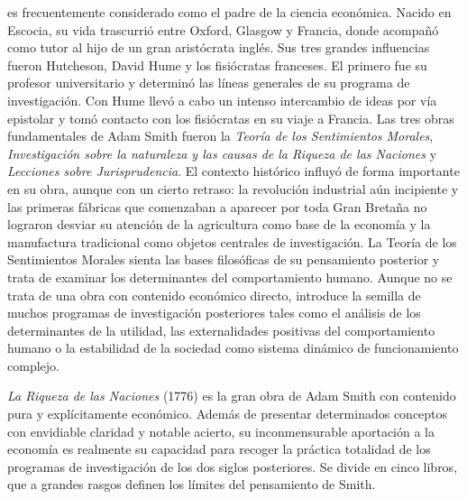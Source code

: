 \documentclass{nuevotema}
\begin{document}
 es frecuentemente considerado como el padre de la ciencia económica. Nacido en Escocia, su vida trascurrió entre Oxford, Glasgow y Francia, donde acompañó como tutor al hijo de un gran aristócrata inglés. Sus tres grandes influencias fueron Hutcheson, David Hume y los fisiócratas franceses. El primero fue su profesor universitario y determinó las líneas generales de su programa de investigación. Con Hume llevó a cabo un intenso intercambio de ideas por vía epistolar y tomó contacto con los fisiócratas en su viaje a Francia. Las tres obras fundamentales de Adam Smith fueron la \textit{Teoría de los Sentimientos Morales}, \textit{Investigación sobre la naturaleza y las causas de la Riqueza de las Naciones} y \textit{Lecciones sobre Jurisprudencia}. El contexto histórico influyó de forma importante en su obra, aunque con un cierto retraso: la revolución industrial aún incipiente y las primeras fábricas que comenzaban a aparecer por toda Gran Bretaña no lograron desviar su atención de la agricultura como base de la economía y la manufactura tradicional como objetos centrales de investigación. La Teoría de los Sentimientos Morales sienta las bases filosóficas de su pensamiento posterior y trata de examinar los determinantes del comportamiento humano. Aunque no se trata de una obra con contenido económico directo, introduce la semilla de muchos programas de investigación posteriores tales como el análisis de los determinantes de la utilidad, las externalidades positivas del comportamiento humano o la estabilidad de la sociedad como sistema dinámico de funcionamiento complejo. 

\textit{La Riqueza de las Naciones} (1776) es la gran obra de Adam Smith con contenido pura y explícitamente económico. Además de presentar determinados conceptos con envidiable claridad y notable acierto, su inconmensurable aportación a la economía es realmente su capacidad para recoger la práctica totalidad de los programas de investigación de los dos siglos posteriores. Se divide en cinco libros, que a grandes rasgos definen los límites del pensamiento de Smith. 
\end{document}
